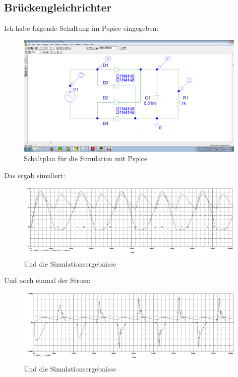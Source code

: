 \subsection{Brückengleichrichter}
Ich habe folgende Schaltung im Pspice eingegeben:
\begin{figure}[H]
	\centering
	\includegraphics[width=\linewidth]{versuch2/spice/v2_6_1_schematic.png}
	\caption{Schaltplan für die Simulation mit Pspice}
\end{figure}
Das ergab simuliert:
\begin{figure}[H]
	\centering
	\includegraphics[width=\linewidth]{versuch2/spice/v2_6_1_simulation.png}
	\caption{Und die Simulationsergebnisse}
\end{figure}
Und noch einmal der Strom:
\begin{figure}[H]
	\centering
	\includegraphics[width=\linewidth]{versuch2/spice/v2_6_1_strom_simulation.png}
	\caption{Und die Simulationsergebnisse}
\end{figure}
